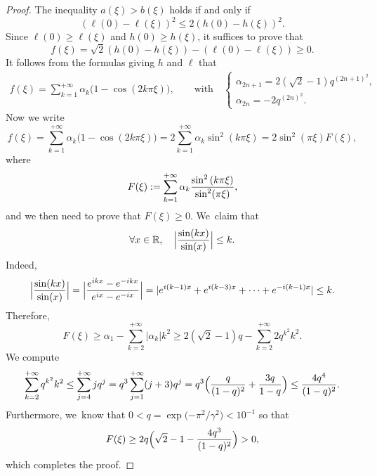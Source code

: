 \documentclass[JEP,XML,SOM,Unicode,NoFloatCountersInSection,published]{cedram}
\theoremstyle{definition}
\let\EE\exp
\let\dis\relax
\newcommand\R{\mathbb R}
\newcommand{\pa}[1]{\left(#1\right)}
\newcommand{\Bpa}[1]{\Bigl(#1\Bigr)}
\newcommand{\Babs}[1]{\Bigl|#1\Bigr|}
\begin{document}
\begin{proof} The inequality $a(\xi) > b(\xi)$ holds if and only if
\[
\pa{\ell(0) - \ell(\xi)}^2 \leq 2\pa{h(0)-h(\xi)}^2.
\]
Since $\ell(0) \geq \ell(\xi)$ and $h(0) \geq h(\xi)$, it suffices to prove that
\[
f(\xi) = \sqrt{2}\pa{h(0)-h(\xi)}-\pa{\ell(0) - \ell(\xi)} \geq 0.
\]
It follows from the formulas giving $h$ and $\ell$ that
\begin{align*}
f(\xi) = \sum_{k=1}^{+\infty}\alpha_k\bigl(1-\cos({2k\pi\xi})\bigr), \qquad \text{with} \quad
\begin{cases} \alpha_{2n+1} =2(\sqrt{2}-1)q^{(2n+1)^2}, \\[6pt] \alpha_{2n} = - 2q^{(2n)^2}. \end{cases}
\end{align*}
Now we write
\begin{equation*}
f(\xi) = \sum_{k=1}^{+\infty}\alpha_k\bigl(1-\cos({2k\pi\xi})\bigr) = 2 \sum_{k=1}^{+\infty}\alpha_k\sin^2\pa{{k\pi\xi}}
= 2\sin^2({\pi\xi}) F(\xi),
\end{equation*}
where
\[
\dis F(\xi): = \sum_{k=1}^{+\infty}\alpha_k\frac{\sin^2\pa{{k\pi\xi}}}{\sin^2({\pi\xi})},
\]
and we then need to prove that $F(\xi) \geq 0$. We~claim that
\[
\forall x \in \R, \quad \Babs{\frac{\sin(kx)}{\sin(x)}} \leq k.
\]
Indeed,
\[
\Babs{\frac{\sin(kx)}{\sin(x)}} = \Babs{\frac{e^{ikx}-e^{-ikx}}{e^{ix}-e^{-ix}}} = |e^{i(k-1)x} + e^{i(k-3)x} + \dots + e^{-i(k-1)x}| \leq k.
\]
Therefore,
\[
F(\xi) \geq \alpha_1 - \sum_{k=2}^{+\infty} |\alpha_k|k^2 \geq 2(\sqrt{2}-1)q- \sum_{k=2}^{+\infty}2q^{k^2}k^2.
\]
We compute
\[
\sum_{k=2}^{+\infty}q^{k^2}k^2 \leq \sum_{j=4}^{+\infty}jq^{j} = q^3\sum_{j=1}^{+\infty}(j+3)q^j = q^3\Bpa{\frac{q}{(1-q)^2}+\frac{3q}{1-q}} \leq \frac{4q^4}{(1-q)^2}.
\]
Furthermore, we~know that $0 < q = \EE\bigl({-{\pi^2}/{\gamma^2}}\bigr) < 10^{-1}$ so that
\[
F(\xi) \geq 2q\Bpa{\sqrt{2}-1 - \frac{4q^3}{(1-q)^2}} > 0,
\]
which completes the proof.
\end{proof}
\end{document}
